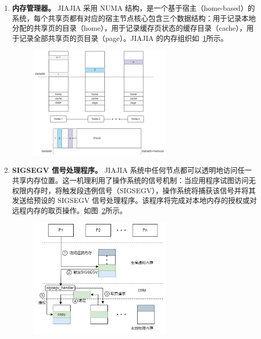 {\begin{enumerate}[label=\arabic*.]
        \item \textbf{内存管理器。} JIAJIA 采用 NUMA 结构，是一个基于宿主（home-based）的系统，每个共享页都有对应的宿主节点核心包含三个数据结构：用于记录本地分配的共享页的目录（home），用于记录缓存页状态的缓存目录（cache），用于记录全部共享页的页目录（page）。JIAJIA 的内存组织如~\ref{fig:JIAJIA-memory}所示。
              \begin{figure}[!htbp]
                  \centering
                  \includegraphics[width=0.65\textwidth]{Img/JIAJIA-memory.png}
                  \label{fig:JIAJIA-memory}
              \end{figure}

        \item \textbf{SIGSEGV 信号处理程序。} JIAJIA 系统中任何节点都可以透明地访问任一共享内存位置。这一机理利用了操作系统的信号机制：当应用程序试图访问无权限内存时，将触发段违例信号（SIGSEGV），操作系统将捕获该信号并将其发送给预设的 SIGSEGV 信号处理程序。该程序将完成对本地内存的授权或对远程内存的取页操作。如图~\ref{fig:JIAJIA-access}所示。
              \begin{figure}[!htbp]
                  \centering
                  \includegraphics[width=0.65\textwidth]{Img/jiajia-access.png}
                  \label{fig:JIAJIA-access}
              \end{figure}


\end{enumerate}}
